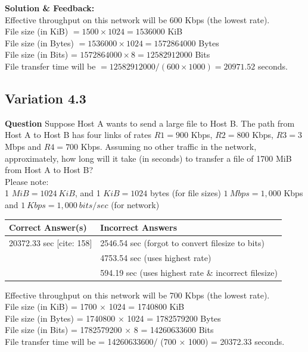\textbf{Solution \& Feedback:}\\
Effective throughput on this network will be 600 Kbps (the lowest rate). \\
File size (in KiB) \(=1500 \times 1024=1536000\) KiB  \\
File size (in Bytes) \(=1536000 \times 1024=1572864000\) Bytes \\
File size (in Bits) = \(1572864000 \times 8=12582912000\) Bits \\
File transfer time will be \(=12582912000/(600 \times 1000)=20971.52\) seconds. \\

\subsection{Variation 4.3}
\textbf{Question} Suppose Host A wants to send a large file to Host B. The path from Host A to Host B has four links of rates \(R1=900\) Kbps, \(R2=800\) Kbps, \(R3=3\) Mbps and \(R4=700\) Kbps. Assuming no other traffic in the network, approximately, how long will it take (in seconds) to transfer a file of 1700 MiB from Host A to Host B?\\
Please note:\\
1 \(MiB=1024~KiB\), and 1 \(KiB=1024\) bytes (for file sizes)
\(1~Mbps=1,000\) Kbps and \(1~Kbps=1,000~bits/sec\) (for network) \\
\begin{tabular}{|l|l|}
    \hline
    \textbf{Correct Answer(s)} & \textbf{Incorrect Answers} \\
    \hline
    20372.33 sec [cite: 158] & 2546.54 sec (forgot to convert filesize to bits) \\
        & 4753.54 sec (uses highest rate) \\
        & 594.19 sec (uses highest rate \& incorrect filesize) \\
    \hline
\end{tabular}

Effective throughput on this network will be 700 Kbps (the lowest rate).\\
File size (in KiB) = 1700 $\times$ 1024 = 1740800 KiB\\
File size (in Bytes) = 1740800 $\times$ 1024 = 1782579200 Bytes\\
File size (in Bits) = 1782579200 $\times$ 8 = 14260633600 Bits\\
File transfer time will be = 14260633600/ (700 $\times$ 1000) = 20372.33 seconds.\\

